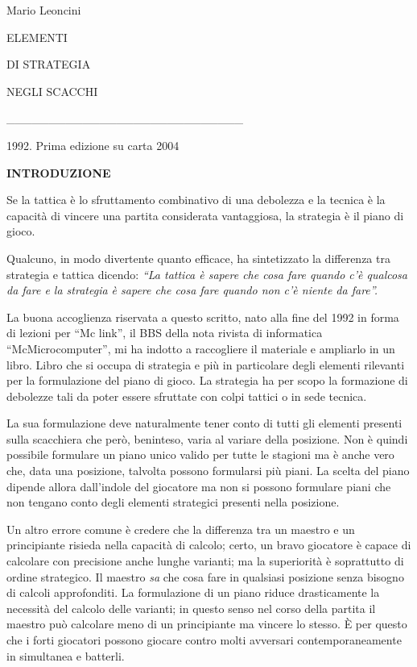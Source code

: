\documentclass[
]{article}
\author{}
\date{}
\begin{document}
Mario Leoncini

ELEMENTI

DI STRATEGIA

NEGLI SCACCHI

\_\_\_\_\_\_\_\_\_\_\_\_\_\_\_\_\_\_\_\_\_\_\_\_\_\_\_\_

1992. Prima edizione su carta 2004

\textbf{INTRODUZIONE}

Se la tattica è lo sfruttamento combinativo di una debolezza e la
tecnica è la capacità di vincere una partita considerata vantaggiosa, la
strategia è il piano di gioco.

Qualcuno, in modo divertente quanto efficace, ha sintetizzato la
differenza tra strategia e tattica dicendo: \emph{``La tattica è sapere
che cosa fare quando c'è qualcosa da fare e la strategia è sapere che
cosa fare quando non c'è niente da fare''.}

La buona accoglienza riservata a questo scritto, nato alla fine del 1992
in forma di lezioni per ``Mc link'', il BBS della nota rivista di
informatica ``McMicrocomputer'', mi ha indotto a raccogliere il
materiale e ampliarlo in un libro. Libro che si occupa di strategia e
più in particolare degli elementi rilevanti per la formulazione del
piano di gioco. La strategia ha per scopo la formazione di debolezze
tali da poter essere sfruttate con colpi tattici o in sede tecnica.

La sua formulazione deve naturalmente tener conto di tutti gli elementi
presenti sulla scacchiera che però, beninteso, varia al variare della
posizione. Non è quindi possibile formulare un piano unico valido per
tutte le stagioni ma è anche vero che, data una posizione, talvolta
possono formularsi più piani. La scelta del piano dipende allora
dall'indole del giocatore ma non si possono formulare piani che non
tengano conto degli elementi strategici presenti nella posizione.

Un altro errore comune è credere che la differenza tra un maestro e un
principiante risieda nella capacità di calcolo; certo, un bravo
giocatore è capace di calcolare con precisione anche lunghe varianti; ma
la superiorità è soprattutto di ordine strategico. Il maestro \emph{sa}
che cosa fare in qualsiasi posizione senza bisogno di calcoli
approfonditi. La formulazione di un piano riduce drasticamente la
necessità del calcolo delle varianti; in questo senso nel corso della
partita il maestro può calcolare meno di un principiante ma vincere lo
stesso. È per questo che i forti giocatori possono giocare contro molti
avversari contemporaneamente in simultanea e batterli.
\end{document}

